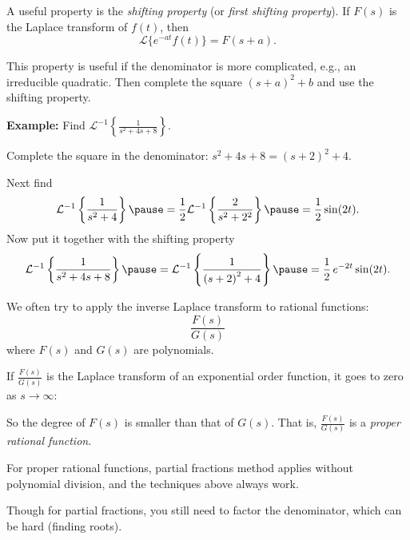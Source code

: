 \documentclass[10pt,aspectratio=169]{beamer}
\begin{document}
\begin{frame}

A useful property is the 
\emph{shifting property} (or \emph{first shifting property}).
If $F(s)$ is the Laplace transform of $f(t)$, then
\begin{equation*}
\mathcal{L} \bigl\{ e^{-at} f(t) \bigr\} = F(s+a) .
\end{equation*}

\pause
This property is useful if the denominator is more complicated, e.g.,
an irreducible quadratic.  Then complete the square
 ${(s+a)}^2+b$
and use
the shifting property.

\medskip
\pause

\textbf{Example:}
Find
${\mathcal{L}}^{-1} \left\{ \frac{1}{s^2+4s+8} \right\}$.

\medskip
\pause

Complete the square in the denominator:
$s^2+4s+8 = {(s+2)}^2+4$.

\medskip
\pause

Next find
\begin{equation*}
{\mathcal{L}}^{-1} \left\{ \frac{1}{s^2+4} \right\}
\pause
=
\frac{1}{2}
{\mathcal{L}}^{-1} \left\{ \frac{2}{s^2+2^2} \right\}
\pause
=
\frac{1}{2} \sin (2t) .
\end{equation*}
\pause
Now put it together with the shifting property
\begin{equation*}
{\mathcal{L}}^{-1} \left\{ \frac{1}{s^2+4s+8} \right\}
\pause
= 
{\mathcal{L}}^{-1} \left\{ \frac{1}{{(s+2)}^2+4} \right\}
\pause
=
\frac{1}{2}\,e^{-2t} \sin (2t) .
\end{equation*}
\end{frame}

\begin{frame}
We often try to 
apply the inverse Laplace transform to
rational functions:
\begin{equation*}
\frac{F(s)}{G(s)}
\end{equation*}
where $F(s)$ and $G(s)$ are polynomials.

\medskip
\pause

If $\frac{F(s)}{G(s)}$ is the Laplace transform of an exponential order function,
it goes to zero as $s \to \infty$:

\pause
So the degree of $F(s)$
is smaller than that of $G(s)$.
That is,
$\frac{F(s)}{G(s)}$ is a \emph{proper rational function}.

\medskip
\pause

For proper rational functions, partial fractions method applies without
polynomial division, and the techniques above always work.

\medskip
\pause

Though for partial fractions, you still need to factor the denominator,
which can be hard (finding roots).

\end{frame}
\end{document}
